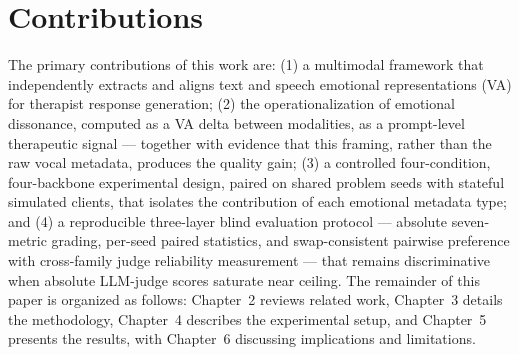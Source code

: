 \section{Contributions}

The primary contributions of this work are: (1) a multimodal framework that independently extracts and aligns text and speech emotional representations (VA) for therapist response generation; (2) the operationalization of emotional dissonance, computed as a VA delta between modalities, as a prompt-level therapeutic signal --- together with evidence that this framing, rather than the raw vocal metadata, produces the quality gain; (3) a controlled four-condition, four-backbone experimental design, paired on shared problem seeds with stateful simulated clients, that isolates the contribution of each emotional metadata type; and (4) a reproducible three-layer blind evaluation protocol --- absolute seven-metric grading, per-seed paired statistics, and swap-consistent pairwise preference with cross-family judge reliability measurement --- that remains discriminative when absolute LLM-judge scores saturate near ceiling. The remainder of this paper is organized as follows: Chapter~2 reviews related work, Chapter~3 details the methodology, Chapter~4 describes the experimental setup, and Chapter~5 presents the results, with Chapter~6 discussing implications and limitations.